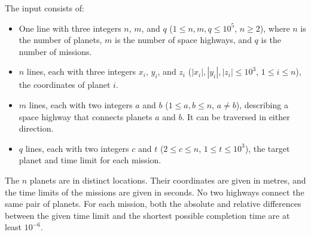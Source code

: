 
  The input consists of:
  \begin{itemize}
    \item One line with three integers $n$, $m$, and $q$ ($1 \le n,m,q \le 10^5$, $n \ge 2$),
      where $n$ is the number of planets, $m$ is the number of space highways, and $q$ is the number of missions.
    \item $n$ lines, each with three integers $x_i$, $y_i$, and $z_i$ ($\left|x_i\right|,\left|y_i\right|,\left|z_i\right| \le 10^3$, $1 \le i \le n$), the coordinates of planet $i$.
    \item $m$ lines, each with two integers $a$ and $b$ ($1 \le a,b \le n$, $a \neq b$), describing a space highway that connects planets $a$ and $b$. It can be traversed in either direction.
    \item $q$ lines, each with two integers $c$ and $t$ ($2 \le c \le n$, $1 \le t \le 10^3$), the target planet and time limit for each mission.
  \end{itemize}
  The $n$ planets are in distinct locations.
  Their coordinates are given in metres, and the time limits of the missions are given in seconds.
  No two highways connect the same pair of planets.
  For each mission, both the absolute and relative differences between the given time limit and the shortest possible completion time are at least $10^{-6}$.
